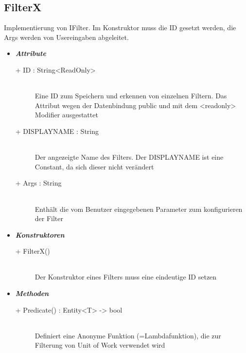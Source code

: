 \documentclass[13pt]{scrreprt}
\begin{document}
	\subsection{FilterX}
	Implementierung von IFilter. Im Konstruktor muss die ID gesetzt werden, die Args werden von Usereingaben abgeleitet.
	\begin{itemize}[label = {$\circ$}]
		\item {\large \textbf{\textit{Attribute}}\par}
		\begin{description}
			\item [+ ID : String<ReadOnly>] \hfill \\Eine ID zum Speichern und erkennen von einzelnen Filtern. Das Attribut wegen der Datenbindung public und mit dem <readonly> Modifier ausgestattet
			\item [+ DISPLAYNAME : String] \hfill \\Der angezeigte Name des Filters. Der DISPLAYNAME ist eine Constant, da sich dieser nicht verändert
			\item [+ Args : String] \hfill \\Enthält die vom Benutzer eingegebenen Parameter zum konfigurieren der Filter
		\end{description}
		\item {\large \textbf{\textit{Konstruktoren}}\par}
		\begin{description}
			\item [+ FilterX()] \hfill \\ Der Konstruktor eines Filters muss eine eindeutige ID setzen
		\end{description}
		\item {\large \textbf{\textit{Methoden}}\par}
		\begin{description}
			\item [+ Predicate() : Entity<T> -> bool] \hfill \\ Definiert eine Anonyme Funktion (=Lambdafunktion), die zur Filterung von Unit of Work verwendet wird
		\end{description}
	\end{itemize}
	\newpage
\end{document}
